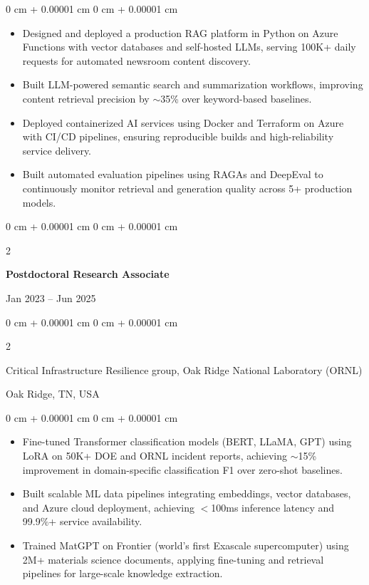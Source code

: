 \documentclass[10pt, letterpaper]{article}
\newenvironment{highlights}{
    \begin{itemize}[
        topsep=0.10 cm,
        parsep=0.10 cm,
        partopsep=0pt,
        itemsep=0pt,
        leftmargin=0 cm + 10pt
    ]
}{
    \end{itemize}
} %
\newenvironment{onecolentry}{
    \begin{adjustwidth}{
        0 cm + 0.00001 cm
    }{
        0 cm + 0.00001 cm
    }
}{
    \end{adjustwidth}
} %
\newenvironment{twocolentry}[2][]{
    \onecolentry
    \def\secondColumn{#2}
    \setcolumnwidth{\fill, 4.5 cm}
    \begin{paracol}{2}
}{
    \switchcolumn \raggedleft \secondColumn
    \end{paracol}
    \endonecolentry
} %
\begin{document}
    \begin{onecolentry}
        \begin{highlights}
            \item Designed and deployed a production RAG platform in Python on Azure Functions with vector databases and self-hosted LLMs, serving 100K+ daily requests for automated newsroom content discovery.
            \item Built LLM-powered semantic search and summarization workflows, improving content retrieval precision by $\sim$35\% over keyword-based baselines.
            \item Deployed containerized AI services using Docker and Terraform on Azure with CI/CD pipelines, ensuring reproducible builds and high-reliability service delivery.
            \item Built automated evaluation pipelines using RAGAs and DeepEval to continuously monitor retrieval and generation quality across 5+ production models.
        \end{highlights}
    \end{onecolentry}

\vspace{1mm}

    \begin{twocolentry}{Jan 2023 -- Jun 2025}
        \textbf{Postdoctoral Research Associate}
    \end{twocolentry}
    \begin{twocolentry}{Oak Ridge, TN, USA}
        Critical Infrastructure Resilience group, Oak Ridge National Laboratory (ORNL)
    \end{twocolentry}
    \vspace{0.10 cm}
    \begin{onecolentry}
        \begin{highlights}
            \item Fine-tuned Transformer classification models (BERT, LLaMA, GPT) using LoRA on 50K+ DOE and ORNL incident reports, achieving $\sim$15\% improvement in domain-specific classification F1 over zero-shot baselines.
            \item Built scalable ML data pipelines integrating embeddings, vector databases, and Azure cloud deployment, achieving $<$100ms inference latency and 99.9\%+ service availability.
            \item Trained MatGPT on Frontier (world's first Exascale supercomputer) using 2M+ materials science documents, applying fine-tuning and retrieval pipelines for large-scale knowledge extraction.
        \end{highlights}
    \end{onecolentry}
\end{document}
